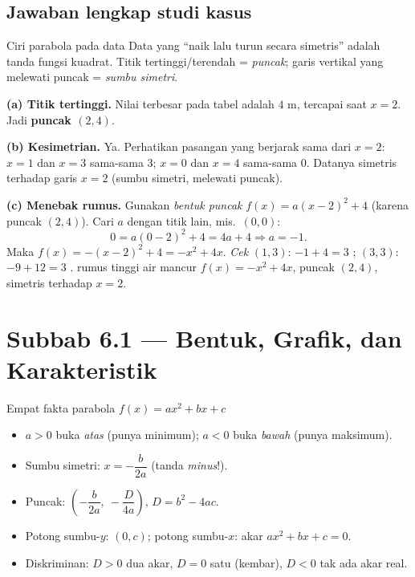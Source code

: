 \subsection*{Jawaban lengkap studi kasus}

\begin{ingat}{Ciri parabola pada data}
Data yang ``naik lalu turun secara simetris'' adalah tanda fungsi kuadrat. Titik
tertinggi/terendah = \emph{puncak}; garis vertikal yang melewati puncak =
\emph{sumbu simetri}.
\end{ingat}

\textbf{(a) Titik tertinggi.} Nilai terbesar pada tabel adalah $4$ m, tercapai
saat $x=2$. Jadi \textbf{puncak $(2,4)$}.

\textbf{(b) Kesimetrian.} Ya. Perhatikan pasangan yang berjarak sama dari $x=2$:
$x=1$ dan $x=3$ sama-sama $3$; $x=0$ dan $x=4$ sama-sama $0$. Datanya simetris
terhadap garis \textbf{$x=2$} (sumbu simetri, melewati puncak).

\textbf{(c) Menebak rumus.} Gunakan \emph{bentuk puncak} $f(x)=a(x-2)^2+4$
(karena puncak $(2,4)$). Cari $a$ dengan titik lain, mis.\ $(0,0)$:
\[
0=a(0-2)^2+4=4a+4 \Rightarrow a=-1.
\]
Maka $f(x)=-(x-2)^2+4=-x^2+4x$. \emph{Cek} $(1,3)$: $-1+4=3$ \checkmark; $(3,3)$:
$-9+12=3$ \checkmark.
\jadi rumus tinggi air mancur $f(x)=-x^2+4x$, puncak $(2,4)$, simetris terhadap
$x=2$.

\section*{Subbab 6.1 — Bentuk, Grafik, dan Karakteristik}

\begin{ingat}{Empat fakta parabola $f(x)=ax^2+bx+c$}
\begin{itemize}[leftmargin=*,topsep=1pt]
  \item $a>0$ buka \emph{atas} (punya minimum); $a<0$ buka \emph{bawah} (punya
  maksimum).
  \item Sumbu simetri: $x=-\dfrac{b}{2a}$ (tanda \emph{minus}!).
  \item Puncak: $\left(-\dfrac{b}{2a},\ -\dfrac{D}{4a}\right)$, $D=b^2-4ac$.
  \item Potong sumbu-$y$: $(0,c)$; potong sumbu-$x$: akar $ax^2+bx+c=0$.
  \item Diskriminan: $D>0$ dua akar, $D=0$ satu (kembar), $D<0$ tak ada akar real.
\end{itemize}
\end{ingat}

